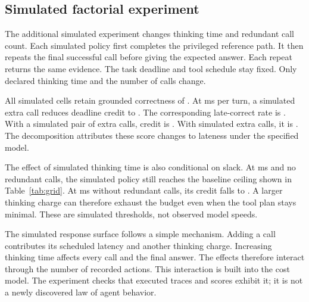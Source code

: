 \documentclass{article}
\begin{document}
\subsection{Simulated factorial experiment}
The additional simulated experiment changes thinking time and redundant call count. Each simulated policy first completes the privileged reference path. It then repeats the final successful call before giving the expected answer. Each repeat returns the same evidence. The task deadline and tool schedule stay fixed. Only declared thinking time and the number of calls change.\par
All simulated cells retain grounded correctness of \AllCorrectRate{}. At \BaseThink{} ms per turn, a simulated extra call reduces deadline credit to \OneExtraRate{}. The corresponding late-correct rate is \OneExtraLate{}. With a simulated pair of extra calls, credit is \TwoExtraRate{}. With \ExtraCount{} simulated extra calls, it is \FourExtraRate{}. The decomposition attributes these score changes to lateness under the specified model.\par
The effect of simulated thinking time is also conditional on slack. At \DoubleThink{} ms and no redundant calls, the simulated policy still reaches the baseline ceiling shown in Table~\ref{tab:grid}. At \SlowThink{} ms without redundant calls, its credit falls to \SlowRate{}. A larger thinking charge can therefore exhaust the budget even when the tool plan stays minimal. These are simulated thresholds, not observed model speeds.\par


The simulated response surface follows a simple mechanism. Adding a call contributes its scheduled latency and another thinking charge. Increasing thinking time affects every call and the final answer. The effects therefore interact through the number of recorded actions. This interaction is built into the cost model. The experiment checks that executed traces and scores exhibit it; it is not a newly discovered law of agent behavior.\par
\end{document}
